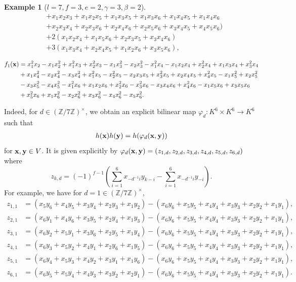 \documentclass[a4paper, 11pt]{amsart}
\newcommand{\Z}{\mathbb Z}
\theoremstyle{plain}
\theoremstyle{definition}
\newtheorem{example}[thm]{Example}
\numberwithin{equation}{section}
\begin{document}
\begin{example}[$l=7, f=3, e=2, \gamma =3, \beta =2$]
\begin{align*}
%
&+ x_1x_2x_3 + x_1x_2x_5 + x_1x_3x_5  + x_1x_3x_6 + x_1x_4x_5  + x_1x_4x_6 \\
&+ x_2x_3x_4 + x_2x_3x_6 + x_2x_4x_6  + x_2x_5x_6 + x_3x_4x_5  + x_4x_5x_6)\\
&+ 2(x_1x_2x_4 + x_1x_5x_6+ x_2x_3x_5  + x_3x_4x_6)\\
&+ 3(x_1x_3x_4 + x_2x_4x_5 + x_1x_2x_6 + x_3x_5x_6),\\
\end{align*}
\begin{align*}
f_1({\bf x})&=x_1^2x_2 - x_1x_2^2 + x_1^2x_3 + x_2^2x_3 - x_1x_3^2 - x_2x_3^2 - x_1^2x_4 - x_1x_2x_4 + x_2^2x_4 + x_1x_3x_4 + x_3^2x_4 \\
&+ x_1x_4^2 - x_2x_4^2 - x_3x_4^2 + x_1^2x_5 - x_2^2x_5 - x_2x_3x_5 + x_3^2x_5 + x_2x_4x_5 + x_4^2x_5 - x_1x_5^2 + x_2x_5^2\\
&- x_3x_5^2 - x_4x_5^2 - x_1^2x_6 + x_1x_2x_6 + x_2^2x_6 - x_3^2x_6 - x_3x_4x_6 + x_4^2x_6 - x_1x_5x_6 + x_3x_5x_6 \\
&+ x_5^2x_6 + x_1x_6^2 - x_2x_6^2 + x_3x_6^2 - x_4x_6^2 - x_5x_6^2.
\end{align*}

Indeed, for $d \in (\Z/7\Z)^\times$, we obtain an explicit bilinear map $\varphi_d :K^6 \times K^6 \rightarrow K^6$ such that 
\begin{align*}
h({\bf x})h({\bf y})=h(\varphi_d ({\bf x}, {\bf y}))
\end{align*}
for ${\bf x},{\bf y} \in V$.
It is given explicitly by
$\varphi_d ({\bf x}, {\bf y}) = (z_{1,d}, z_{2,d}, z_{3,d}, z_{4,d},z_{5,d},z_{6,d})$
where 
\[
z_{k,d}=(-1)^{f-1}\left(\sum_{i=1}^{6}x_{-d^{-1}i}y_{k-i} - \sum_{i=1}^{6}x_{-d^{-1}i}y_{-i}\right).
\]
For example, we have for $d=1 \in (\Z/7\Z)^\times$,
\begin{align*}
z_{1,1}
&=( x_5y_6 + x_4y_5 + x_3y_4 + x_2y_3 + x_1y_2 )
-(x_6y_6 + x_5y_5 + x_4y_4 + x_3y_3 + x_2y_2 + x_1y_1 ),\\
z_{2,1}
&=(x_6y_1 + x_4y_6 + x_3y_5 + x_2y_4 + x_1y_3 )
-(x_6y_6 + x_5y_5 + x_4y_4 + x_3y_3 + x_2y_2 + x_1y_1 ),\\
z_{3,1}
&=(x_6y_2 + x_5y_1 + x_3y_6 + x_2y_5 + x_1y_4 )
-(x_6y_6 + x_5y_5 + x_4y_4 + x_3y_3 + x_2y_2 + x_1y_1 ),\\
z_{4,1}
&=(x_6y_3 + x_5y_2 + x_4y_1 + x_2y_6 + x_1y_5 )
-(x_6y_6 + x_5y_5 + x_4y_4 + x_3y_3 + x_2y_2 + x_1y_1 ),\\
z_{5,1}
&=( x_6y_4 + x_5y_3 + x_4y_2 + x_3y_1 + x_1y_6 )
-(x_6y_6 + x_5y_5 + x_4y_4 + x_3y_3 + x_2y_2 + x_1y_1 ),\\
z_{6,1}
&=(x_6y_5 + x_5y_4 + x_4y_3 + x_3y_2 + x_2y_1)
-(x_6y_6 + x_5y_5 + x_4y_4 + x_3y_3 + x_2y_2 + x_1y_1 ). 
\end{align*}


\end{example}
\end{document}
